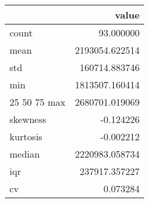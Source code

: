 \begin{tabular}{lr}
\toprule
 & value \\
\midrule
count & 93.000000 \\
mean & 2193054.622514 \\
std & 160714.883746 \\
min & 1813507.160414 \\
25%
50%
75%
max & 2680701.019069 \\
skewness & -0.124226 \\
kurtosis & -0.002212 \\
median & 2220983.058734 \\
iqr & 237917.357227 \\
cv & 0.073284 \\
\bottomrule
\end{tabular}

